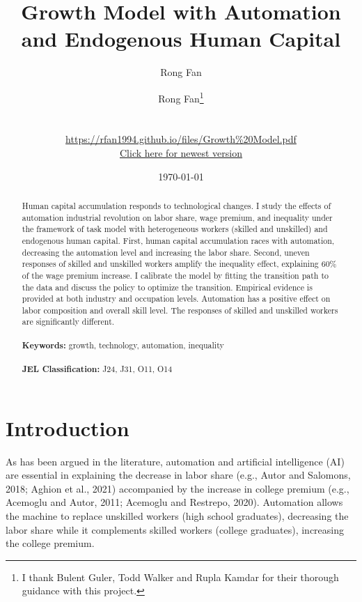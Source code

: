 \documentclass[12pt]{article}
\date{}
\author{Rong Fan}
\begin{document}
\begin{titlepage}
\title{Growth Model with Automation and Endogenous Human Capital}
\author{Rong Fan\thanks{I thank Bulent Guler, Todd Walker and Rupla Kamdar for their thorough guidance with this project.} 
\\
\\
\\ \href{https://rfan1994.github.io/files/Growth\%20Model.pdf}{https://rfan1994.github.io/files/Growth\%20Model.pdf}
\\ \href{https://rfan1994.github.io/files/Growth\%20Model.pdf}{Click here for newest version}}
\date{\today}
\maketitle

\begin{abstract}
\noindent Human capital accumulation responds to technological changes. I study the effects of automation industrial revolution on labor share, wage premium, and inequality under the framework of task model with heterogeneous workers (skilled and unskilled) and endogenous human capital. First, human capital accumulation races with automation, decreasing the automation level and increasing the labor share. Second, uneven responses of skilled and unskilled workers amplify the inequality effect, explaining 60\% of the wage premium increase. I calibrate the model by fitting the transition path to the data and discuss the policy to optimize the transition. Empirical evidence is provided at both industry and occupation levels. Automation has a positive effect on labor composition and overall skill level. The responses of skilled and unskilled workers are significantly different. \\
\vspace{0in}\\
\noindent\textbf{Keywords:} growth, technology, automation, inequality\\
\vspace{0in}\\
\noindent\textbf{JEL Classification: } J24, J31, O11, O14\\

\bigskip
\end{abstract}
\setcounter{page}{0}
\thispagestyle{empty}
\end{titlepage}
\pagebreak \newpage

\section{Introduction}
As has been argued in the literature, automation and artificial intelligence (AI) are essential in explaining the decrease in labor share (e.g., Autor and Salomons, 2018\cite{AutorSalomons2018}; Aghion et al., 2021\nocite{Aghionetal2021}) accompanied by the increase in college premium (e.g., Acemoglu and Autor, 2011\nocite{AcemogluAutor2011}; Acemoglu and Restrepo, 2020\nocite{AcemogluRestrepo2020}). Automation allows the machine to replace unskilled workers (high school graduates), decreasing the labor share while it complements skilled workers (college graduates), increasing the college premium.
\end{document}
